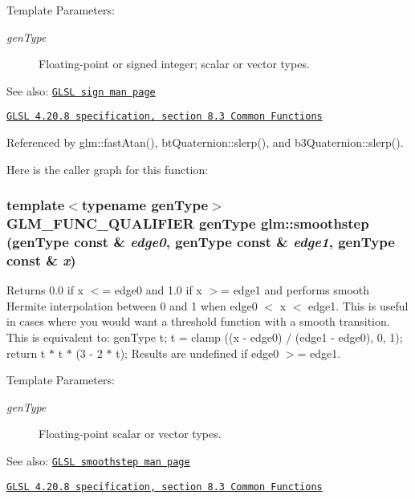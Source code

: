 \begin{Desc}
\item[Template Parameters:]
\begin{description}
\item[{\em genType}]Floating-point or signed integer; scalar or vector types.\end{description}
\end{Desc}
\begin{Desc}
\item[See also:]\href{http://www.opengl.org/sdk/docs/manglsl/xhtml/sign.xml}{\tt GLSL sign man page} 

\href{http://www.opengl.org/registry/doc/GLSLangSpec.4.20.8.pdf}{\tt GLSL 4.20.8 specification, section 8.3 Common Functions} \end{Desc}


Referenced by glm::fastAtan(), btQuaternion::slerp(), and b3Quaternion::slerp().

Here is the caller graph for this function:\hypertarget{group__core__func__common_gcd449790122dcacf69b7e8a53f97fdd8}{
\subsubsection[smoothstep]{\setlength{\rightskip}{0pt plus 5cm}template$<$typename genType$>$ GLM\_\-FUNC\_\-QUALIFIER genType glm::smoothstep (genType const \& {\em edge0}, \/  genType const \& {\em edge1}, \/  genType const \& {\em x})}}
\label{group__core__func__common_gcd449790122dcacf69b7e8a53f97fdd8}


Returns 0.0 if x $<$= edge0 and 1.0 if x $>$= edge1 and performs smooth Hermite interpolation between 0 and 1 when edge0 $<$ x $<$ edge1. This is useful in cases where you would want a threshold function with a smooth transition. This is equivalent to: genType t; t = clamp ((x - edge0) / (edge1 - edge0), 0, 1); return t $\ast$ t $\ast$ (3 - 2 $\ast$ t); Results are undefined if edge0 $>$= edge1.

\begin{Desc}
\item[Template Parameters:]
\begin{description}
\item[{\em genType}]Floating-point scalar or vector types.\end{description}
\end{Desc}
\begin{Desc}
\item[See also:]\href{http://www.opengl.org/sdk/docs/manglsl/xhtml/smoothstep.xml}{\tt GLSL smoothstep man page} 

\href{http://www.opengl.org/registry/doc/GLSLangSpec.4.20.8.pdf}{\tt GLSL 4.20.8 specification, section 8.3 Common Functions} \end{Desc}


